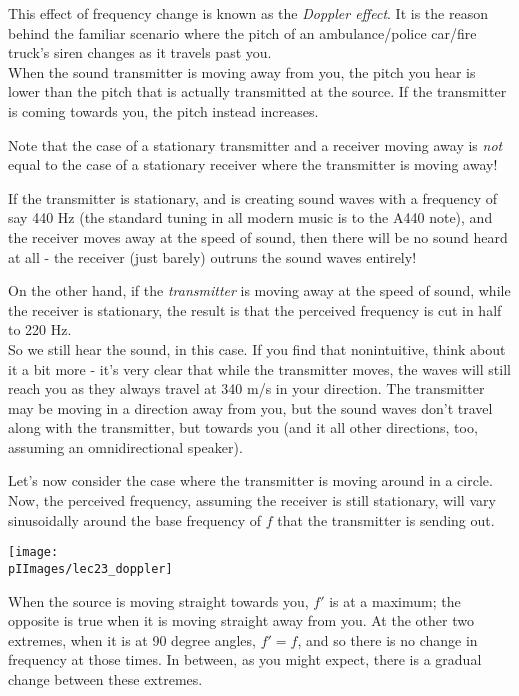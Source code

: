 This effect of frequency change is known as the \emph{Doppler effect}. It is the reason behind the familiar scenario where the pitch of an ambulance/police car/fire truck's siren changes as it travels past you.\\
When the sound transmitter is moving away from you, the pitch you hear is lower than the pitch that is actually transmitted at the source. If the transmitter is coming towards you, the pitch instead increases.

Note that the case of a stationary transmitter and a receiver moving away is \emph{not} equal to the case of a stationary receiver where the transmitter is moving away!

If the transmitter is stationary, and is creating sound waves with a frequency of say 440 Hz (the standard tuning in all modern music is to the A440 note), and the receiver moves away at the speed of sound, then there will be no sound heard at all - the receiver (just barely) outruns the sound waves entirely!

On the other hand, if the \emph{transmitter} is moving away at the speed of sound, while the receiver is stationary, the result is that the perceived frequency is cut in half to 220 Hz.\\
So we still hear the sound, in this case. If you find that nonintuitive, think about it a bit more - it's very clear that while the transmitter moves, the waves will still reach you as they always travel at 340 m/s in your direction. The transmitter may be moving in a direction away from you, but the sound waves don't travel along with the transmitter, but towards you (and it all other directions, too, assuming an omnidirectional speaker).

Let's now consider the case where the transmitter is moving around in a circle. Now, the perceived frequency, assuming the receiver is still stationary, will vary sinusoidally around the base frequency of $f$ that the transmitter is sending out.

\begin{center}
\texttt{[image: \\pIImages/lec23\_doppler]}
\end{center}

When the source is moving straight towards you, $f'$ is at a maximum; the opposite is true when it is moving straight away from you. At the other two extremes, when it is at 90 degree angles, $f' = f$, and so there is no change in frequency at those times. In between, as you might expect, there is a gradual change between these extremes.

